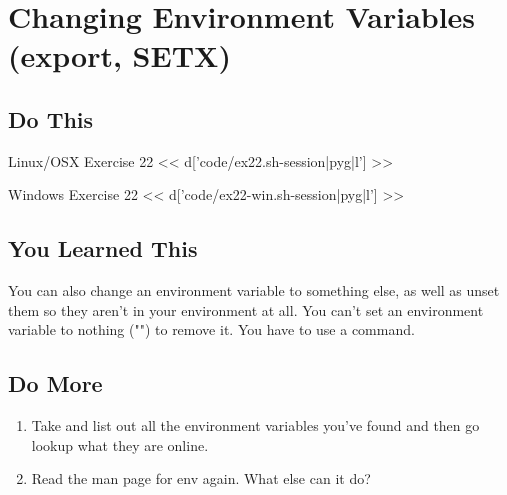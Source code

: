 \chapter{Changing Environment Variables (export, SETX)}

\section{Do This}

\begin{code}{Linux/OSX Exercise 22}
<< d['code/ex22.sh-session|pyg|l'] >>
\end{code}

\begin{code}{Windows Exercise 22}
<< d['code/ex22-win.sh-session|pyg|l'] >>
\end{code}

\section{You Learned This}

You can also change an environment variable to something else, as well as
unset them so they aren't in your environment at all.  You can't set an
environment variable to nothing ("") to remove it.  You have to use a 
command.

\section{Do More}

\begin{enumerate}
\item Take and list out all the environment variables you've found and 
    then go lookup what they are online.
\item Read the man page for env again.  What else can it do?
\end{enumerate}

